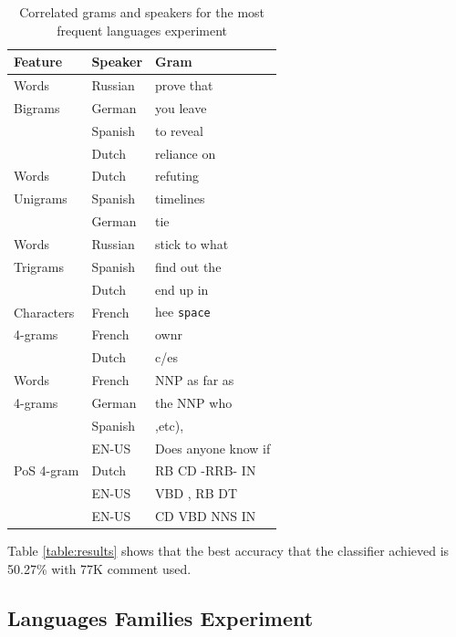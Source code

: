 \documentclass[11pt]{article}
\begin{document}
\begin{table}[htp]
\begin{tabular}{l|ll}
	Feature & Speaker  & Gram
	\\\hline
	Words & Russian &prove that\\
	 Bigrams& German& you leave\\
	 & Spanish& to reveal\\
	 & Dutch & reliance on\\\hline
	 
	Words &Dutch& refuting\\
	   Unigrams&Spanish&timelines\\
	    &German& tie\\\hline
	    
	Words 	&Russian& stick to what\\
	Trigrams&Spanish& find out the\\
	&Dutch& end up in\\\hline

	Characters &French& hee \verb+space+\\
	4-grams	&French&ownr\\
		&Dutch&c/es\\
	\hline

	Words &French& NNP as far as\\
	4-grams &German& the NNP who\\
	&Spanish& ,etc),\\
	&EN-US& Does anyone know if\\\hline
	
	PoS 4-gram &Dutch& RB CD -RRB- IN \\
	&EN-US& VBD , RB DT\\
	&EN-US& CD VBD NNS IN\\
	
\end{tabular}
\label{table:nonnative}
\caption{Correlated grams and speakers for the most frequent languages experiment}
\end{table}


Table \ref{table:results} shows that the best accuracy that the classifier achieved is 50.27\% with 77K comment used. 
\subsection{Languages Families Experiment}
\end{document}
